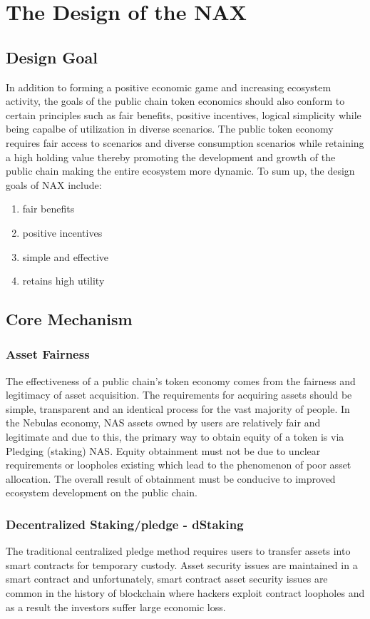 \section{The Design of the NAX}
\subsection{Design Goal}
In addition to forming a positive economic game and increasing ecosystem activity, the goals of the public chain token economics should also conform to certain principles such as fair benefits, positive incentives, logical simplicity while being capalbe of utilization in diverse scenarios. The public token economy requires fair access to scenarios and diverse consumption scenarios while retaining a high holding value thereby promoting the development and growth of the public chain making the entire ecosystem more dynamic. To sum up, the design goals of NAX include:

\begin{enumerate}[\hspace{2cm}(a)]
    \item fair benefits
    \item positive incentives
    \item simple and effective
    \item retains high utility
\end{enumerate}

\subsection{Core Mechanism}

\subsubsection{Asset Fairness}
The effectiveness of a public chain's token economy comes from the fairness and legitimacy of asset acquisition. The requirements for acquiring assets should be simple, transparent and an identical process for the vast majority of people. In the Nebulas economy, NAS assets owned by users are relatively fair and legitimate and due to this, the primary way to obtain equity of a token is via Pledging (staking) NAS. Equity obtainment must not be due to unclear requirements or loopholes existing which lead to the phenomenon of poor asset allocation. The overall result of obtainment must be conducive to improved ecosystem development on the public chain.

\subsubsection{Decentralized Staking/pledge - dStaking}
The traditional centralized pledge method requires users to transfer assets into smart contracts for temporary custody. Asset security issues are maintained in a smart contract and unfortunately, smart contract asset security issues are common in the history of blockchain where hackers exploit contract loopholes and as a result the investors suffer large economic loss. 

